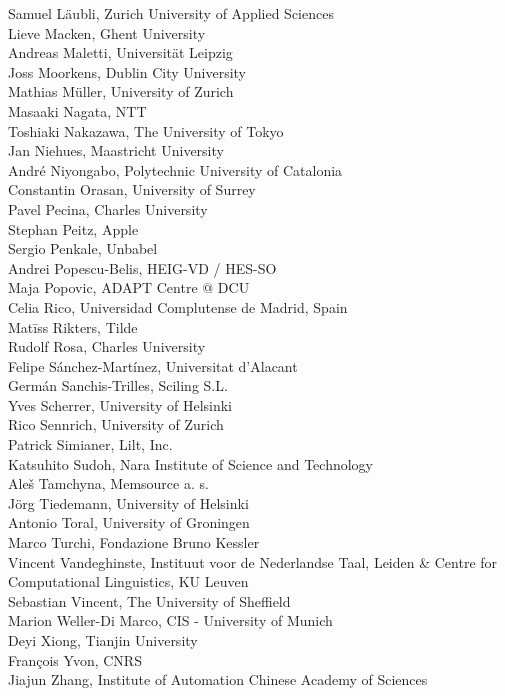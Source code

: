 \documentclass[a4paper,11pt,twoside]{book}
\begin{document}
\noindent Samuel Läubli, Zurich University of Applied Sciences\\
\noindent Lieve Macken, Ghent University\\
\noindent Andreas Maletti, Universität Leipzig\\
\noindent Joss Moorkens, Dublin City University\\
\noindent Mathias Müller, University of Zurich\\
\noindent Masaaki Nagata, NTT\\
\noindent Toshiaki Nakazawa, The University of Tokyo\\
\noindent Jan Niehues, Maastricht University\\
\noindent André Niyongabo, Polytechnic University of Catalonia\\
\noindent Constantin Orasan, University of Surrey\\
\noindent Pavel Pecina, Charles University\\
\noindent Stephan Peitz, Apple\\
\noindent Sergio Penkale, Unbabel\\
\noindent Andrei Popescu-Belis, HEIG-VD / HES-SO\\
\noindent Maja Popovic, ADAPT Centre @ DCU\\
\noindent Celia Rico, Universidad Complutense de Madrid, Spain\\
\noindent Matīss Rikters, Tilde\\
\noindent Rudolf Rosa, Charles University\\
\noindent Felipe Sánchez-Martínez, Universitat d'Alacant\\
\noindent Germán Sanchis-Trilles, Sciling S.L.\\
\noindent Yves Scherrer, University of Helsinki\\
\noindent Rico Sennrich, University of Zurich\\
\noindent Patrick Simianer, Lilt, Inc.\\
\noindent Katsuhito Sudoh, Nara Institute of Science and Technology\\
\noindent Aleš Tamchyna, Memsource a. s.\\
\noindent Jörg Tiedemann, University of Helsinki\\
\noindent Antonio Toral, University of Groningen\\
\noindent Marco Turchi, Fondazione Bruno Kessler\\
\noindent Vincent Vandeghinste, Instituut voor de Nederlandse Taal, Leiden \& Centre for Computational Linguistics, KU Leuven\\
\noindent Sebastian Vincent, The University of Sheffield\\
\noindent Marion Weller-Di Marco, CIS - University of Munich\\
\noindent Deyi Xiong, Tianjin University\\
\noindent François Yvon, CNRS\\
\noindent Jiajun Zhang, Institute of Automation Chinese Academy of Sciences\\
\end{document}
